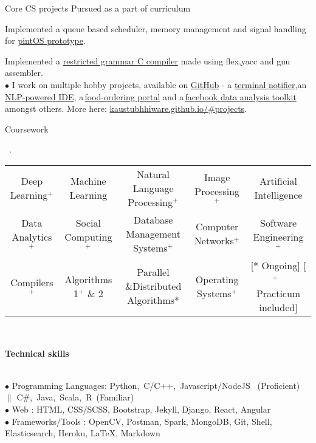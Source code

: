 \documentclass[11pt, a4paper]{resume}
\newcommand{\important}[1]{
  \textcolor{mypurple}{#1}
}
\newcommand{\fillit}[1]{
  \leavevmode\xleaders\hbox{#1}\hfill\kern0pt
}
\newcommand{\sectionTitle}[1]{
  \begin{Large}
      \important{\textbf{#1}} 
    \end{Large}
    \important{\rlap{\rule[.5ex]{\linegoal}{0.5pt}}{}}
     \vspace{0.1em}\\
}
\newcommand{\sectionSubtitleX}[1]{
  \begin{large}
    \important{#1}
    \end{large}
    \fillit{\important{.}}
}
\begin{document}
\begin{rSubsection}{Core CS projects}{\hspace*{\fill} Pursued as a part of curriculum}{}{}
\item Implemented a queue based scheduler, memory management and signal handling for \href{https://github.com/kaustubhhiware/OSLab}{pintOS prototype}.
\item Implemented a \href{https://github.com/kaustubhhiware/cOMPILER}{restricted grammar C compiler} made using flex,yacc and gnu assembler.\\
$\bullet$ I work on multiple hobby projects, available on \href{https://github.com/kaustubhhiware}{GitHub} - a \href{https://github.com/kaustubhhiware/ NotiFyre}{terminal notifier},an\,\href{https://github.com/kaustubhhiware/c0derunR}{ NLP-powered IDE}, a\,\href{https://github.com/kaustubhhiware/Foodspark}{food-ordering portal} and a\,\href{https://github.com/kaustubhhiware/facebook-archive}{facebook data analysis toolkit} amongst others. More here: \href{https://kaustubhhiware.github.io/#projects}{kaustubhhiware.github.io/\#projects}.
\end{rSubsection}

\sectionSubtitleX{Coursework} 
\begin{tabular}{>{\footnotesize}c>{\footnotesize}c>{\footnotesize}c>{\footnotesize}c>{\footnotesize}c}
Deep Learning$^+$ & Machine Learning & Natural Language Processing$^+$ & Image Processing\*$^+$ & Artificial Intelligence \\
Data Analytics$^+$ & Social Computing$^+$ & Database Management Systems$^+$ & Computer Networks$^+$ & Software Engineering$^+$ \\
Compilers$^+$ & Algorithms 1$^+$ \& 2 & Parallel \&Distributed Algorithms* & Operating Systems$^+$ & {\scriptsize [* Ongoing]\,\,[$^+$ \,\,Practicum included]} \\
\end{tabular}\\

\sectionTitle{Technical skills}
$\bullet$ Programming Languages: Python,\, C/C++,\, Javascript/NodeJS \, (Proficient)\, $\|$ C\#,\, Java,\, Scala,\, R\, (Familiar) \\
$\bullet$ Web : HTML, CSS/SCSS, Bootstrap, Jekyll, Django, React, Angular \\
$\bullet$  Frameworks/Tools
: OpenCV, Postman, Spark, MongoDB, Git, Shell, Elasticsearch, Heroku, LaTeX, Markdown
\end{document}

